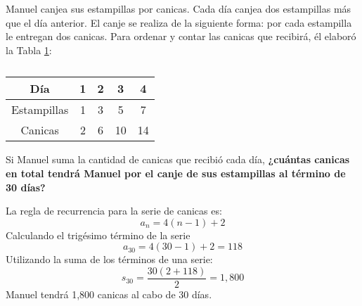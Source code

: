 Manuel canjea sus estampillas por canicas. Cada día canjea dos estampillas más que el día anterior.
El canje se realiza de la siguiente forma: por cada estampilla le entregan dos canicas.
Para ordenar y contar las canicas que recibirá, él elaboró la Tabla \ref{tab:estampillas}:

\begin{table}[H]
    \centering
    \caption{}
    \label{tab:estampillas}
    \begin{tabular}{c|c|c|c|c}
        Día         & 1 & 2 & 3  & 4  \\ \hline
        Estampillas & 1 & 3 & 5  & 7  \\ \hline
        Canicas     & 2 & 6 & 10 & 14
    \end{tabular}
\end{table}

Si Manuel suma la cantidad de canicas que recibió cada día,
\textbf{¿cuántas canicas en total tendrá Manuel por el canje de sus estampillas al término de 30 días?}\\

\begin{solutionbox}{6.5cm}
    La regla de recurrencia para la serie de canicas es:
    \[a_n=4(n-1)+2\]
    Calculando el trigésimo término de la serie
    \[a_{30}=4(30-1)+2=118\]
    Utilizando la suma de los términos de una serie:
    \[s_{30}=\dfrac{30(2+118)}{2}=1,800\]
    Manuel tendrá 1,800 canicas al cabo de 30 días.
\end{solutionbox}
